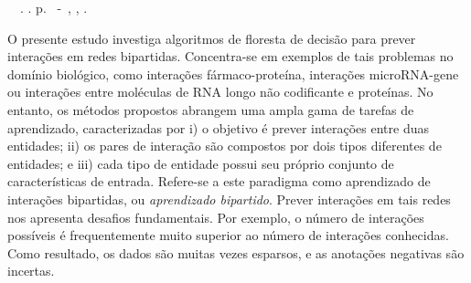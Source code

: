 \setlength{\absparsep}{18pt} %
\begin{resumo}
	\begin{flushleft} 
			\setlength{\absparsep}{0pt} %
			\SingleSpacing 
			\imprimirautorabr~~\textbf{\imprimirtituloresumo}.	\imprimirdata. \pageref{LastPage}p. 
			\imprimirtipotrabalho~-~\imprimirinstituicao, \imprimirlocal, \imprimirdata. 
 	\end{flushleft}
\OnehalfSpacing 				
	O presente estudo investiga algoritmos de floresta de decisão para prever interações em redes bipartidas.
	Concentra-se em exemplos de tais problemas no domínio biológico, como interações fármaco-proteína, interações microRNA-gene ou interações entre moléculas de RNA longo não codificante e proteínas.
	No entanto, os métodos propostos abrangem uma ampla gama de tarefas de aprendizado, caracterizadas por i) o objetivo é prever interações entre duas entidades; ii) os pares de interação são compostos por dois tipos diferentes de entidades; e iii) cada tipo de entidade possui seu próprio conjunto de características de entrada. 
	Refere-se a este paradigma como aprendizado de interações bipartidas, ou \emph{aprendizado bipartido}.
	Prever interações em tais redes nos apresenta desafios fundamentais. Por exemplo, o número de interações possíveis é frequentemente muito superior ao número de interações conhecidas. Como resultado, os dados são muitas vezes esparsos, e as anotações negativas são incertas.

\end{resumo}
